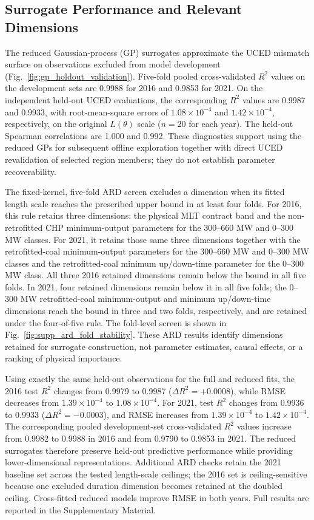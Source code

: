 \subsection{Surrogate Performance and Relevant Dimensions}

The reduced Gaussian-process (GP) surrogates approximate the UCED mismatch surface on observations excluded from model development (Fig.~\ref{fig:gp_holdout_validation}). Five-fold pooled cross-validated $R^2$ values on the development sets are 0.9988 for 2016 and 0.9853 for 2021. On the independent held-out UCED evaluations, the corresponding $R^2$ values are 0.9987 and 0.9933, with root-mean-square errors of $1.08\times10^{-4}$ and $1.42\times10^{-4}$, respectively, on the original $L(\theta)$ scale ($n=20$ for each year). The held-out Spearman correlations are 1.000 and 0.992. These diagnostics support using the reduced GPs for subsequent offline exploration together with direct UCED revalidation of selected region members; they do not establish parameter recoverability.

The fixed-kernel, five-fold ARD screen excludes a dimension when its fitted length scale reaches the prescribed upper bound in at least four folds. For 2016, this rule retains three dimensions: the physical MLT contract band and the non-retrofitted CHP minimum-output parameters for the 300--660 MW and 0--300 MW classes. For 2021, it retains those same three dimensions together with the retrofitted-coal minimum-output parameters for the 300--660 MW and 0--300 MW classes and the retrofitted-coal minimum up/down-time parameter for the 0--300 MW class. All three 2016 retained dimensions remain below the bound in all five folds. In 2021, four retained dimensions remain below it in all five folds; the 0--300 MW retrofitted-coal minimum-output and minimum up/down-time dimensions reach the bound in three and two folds, respectively, and are retained under the four-of-five rule. The fold-level screen is shown in Fig.~\ref{fig:supp_ard_fold_stability}. These ARD results identify dimensions retained for surrogate construction, not parameter estimates, causal effects, or a ranking of physical importance.

Using exactly the same held-out observations for the full and reduced fits, the 2016 test $R^2$ changes from 0.9979 to 0.9987 ($\Delta R^2=+0.0008$), while RMSE decreases from $1.39\times10^{-4}$ to $1.08\times10^{-4}$. For 2021, test $R^2$ changes from 0.9936 to 0.9933 ($\Delta R^2=-0.0003$), and RMSE increases from $1.39\times10^{-4}$ to $1.42\times10^{-4}$. The corresponding pooled development-set cross-validated $R^2$ values increase from 0.9982 to 0.9988 in 2016 and from 0.9790 to 0.9853 in 2021. The reduced surrogates therefore preserve held-out predictive performance while providing lower-dimensional representations. Additional ARD checks retain the 2021 baseline set across the tested length-scale ceilings; the 2016 set is ceiling-sensitive because one excluded duration dimension becomes retained at the doubled ceiling. Cross-fitted reduced models improve RMSE in both years. Full results are reported in the Supplementary Material.

